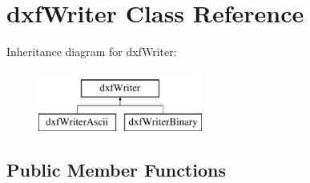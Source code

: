 \hypertarget{classdxfWriter}{\section{dxf\-Writer Class Reference}
\label{classdxfWriter}
}
Inheritance diagram for dxf\-Writer\-:\begin{figure}[H]
\begin{center}
\leavevmode
\includegraphics[height=2.000000cm]{classdxfWriter}
\end{center}
\end{figure}
\subsection*{Public Member Functions}
